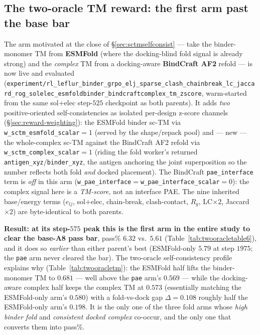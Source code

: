 \documentclass[11pt]{article}
\newcommand{\ttk}[1]{\texttt{\small #1}}
\begin{document}
\subsection{The two-oracle TM reward: the first arm past the base bar}
\label{sec:twooracle}
The arm motivated at the close of \S\ref{sec:sctmselfconsist} --- take the binder-monomer TM from
\textbf{ESMFold} (where the docking-blind fold signal is already strong) and the \emph{complex} TM from
a docking-aware \textbf{BindCraft AF2} refold --- is now live and evaluated
(\ttk{experiment/rl\_leflur\_binder\_grpo\_elj\_sparse\_clash\_chainbreak\_lc\_jaccard\_rog\_solelec\_esmfoldbinder\_bindcraftcomplex\_tm\_zscore},
warm-started from the same sol$+$elec step-$525$ checkpoint as both parents). It adds \emph{two}
positive-oriented self-consistencies as isolated per-design z-score channels (\S\ref{sec:reward-weighting}):
the ESMFold binder sc-TM via \ttk{w\_sctm\_esmfold\_scalar}$=1$ (served by the shape/repack pool) and
--- new --- the whole-complex sc-TM against the BindCraft AF2 refold via
\ttk{w\_sctm\_complex\_scalar}$=1$ (riding the fold worker's returned \ttk{antigen\_xyz}/\ttk{binder\_xyz},
the antigen anchoring the joint superposition so the number reflects both fold \emph{and} docked
placement). The BindCraft \ttk{pae\_interface} term is \emph{off} in this arm
(\ttk{w\_pae\_interface}$=$\ttk{w\_pae\_interface\_scalar}$=0$): the complex signal here is a
\emph{TM-score}, not an interface PAE. The nine inherited base/energy terms ($e_{lj}$, sol$+$elec,
chain-break, clash-contact, $R_g$, LC$\times2$, Jaccard$\times2$) are byte-identical to both parents.

\textbf{Result: at its step-$575$ peak this is the first arm in the entire study to clear the base-A8
pass bar}, pass\% $\mathbf{6.32}$ vs.\ $5.61$ (Table~\ref{tab:twooracletable6}), and it does so
\emph{earlier} than either parent's best (ESMFold-only $5.79$ at step $1975$; the \ttk{pae} arm never
cleared the bar). The two-oracle self-consistency profile explains why (Table~\ref{tab:twooracletm}):
the ESMFold half lifts the binder-monomer TM to $0.681$ --- well above the \ttk{pae} arm's $0.569$ ---
while the docking-aware complex half keeps the complex TM at $0.573$ (essentially matching the
ESMFold-only arm's $0.580$) with a fold-vs-dock gap $\Delta=0.108$ roughly half the ESMFold-only arm's
$0.198$. It is the only one of the three fold arms whose \emph{high binder fold} and \emph{consistent
docked complex} co-occur, and the only one that converts them into pass\%.
\end{document}
